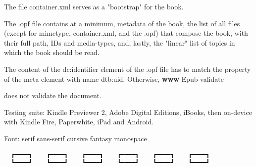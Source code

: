 \documentclass[
]{article}
\begin{document}
The file container.xml serves as a "bootstrap" for the book.

The .opf file contains at a minimum, metadata of the book, the list of
all files (except for mimetype, container.xml, and the .opf) that
compose the book, with their full path, IDs and media-types, and,
lastly, the "linear" list of topics in which the book should be read.

The content of the dc:identifier element of the .opf file has to match
the property of the meta element with name dtb:uid. Otherwise,
\textbf{www} Epub-validate

does not validate the document.

Testing suite: Kindle Previewer 2, Adobe Digital Editions, iBooks, then
on-device with Kindle Fire, Paperwhite, iPad and Android.

Font: serif sans-serif cursive fantasy monospace

\begin{verbatim}
  ┏━━━━┓    ┏━━━━┓    ┏━━━━┓    ┏━━━━┓    ┏━━━━┓    ┏━━━━┓  
  ┗━━━━┛    ┗━━━━┛    ┗━━━━┛    ┗━━━━┛    ┗━━━━┛    ┗━━━━┛  
\end{verbatim}
\end{document}
